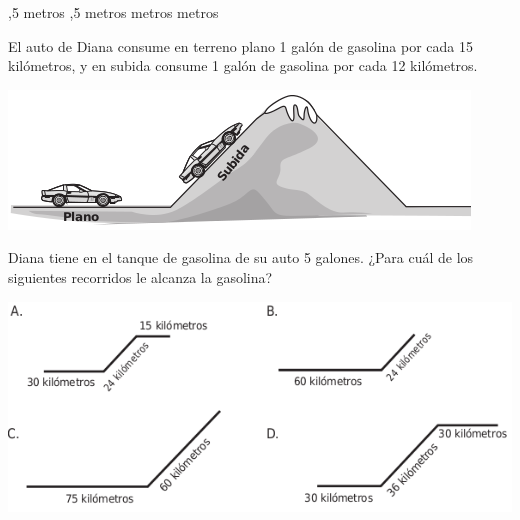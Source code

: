 \documentclass[10pt,letterpaper,addpoints]{exam}
\begin{document}
\begin{multicols}{2}
\begin{questions}
\begin{multicols}{2}
\begin{choices}
,5 metros
,5 metros
 metros
 metros
\end{choices}
\end{multicols}
\question El auto de Diana consume en terreno plano 1 galón de gasolina por cada 15 kilómetros, y en subida consume 1 galón de gasolina por cada 12 kilómetros.
\begin{center}
\includegraphics[scale=.5]{Images/carro_diana.png} 
\end{center}
Diana tiene en el tanque de gasolina de su auto 5 galones. ¿Para cuál de los siguientes recorridos le alcanza la gasolina?
\begin{center}
\includegraphics[scale=.4]{Images/recorridos_diana.png} 
\end{center}
\end{questions}
\end{multicols}
\end{document}
